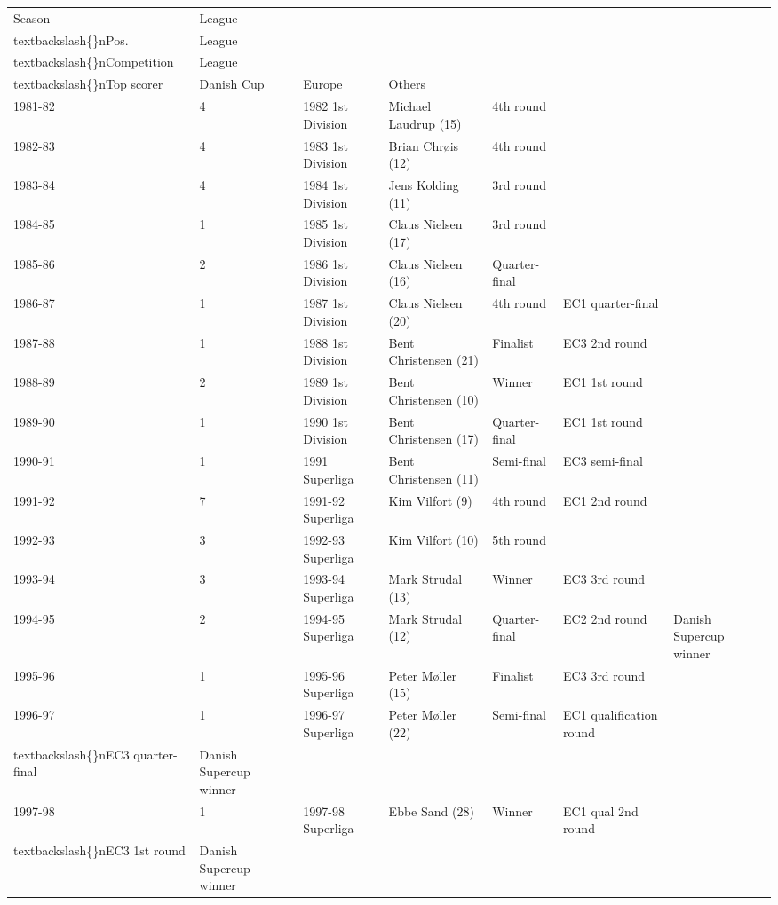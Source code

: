 \documentclass{article}
\begin{document}
\begin{tabular}{lllllll}
\toprule
Season & League\\textbackslash\{\}nPos. & League\\textbackslash\{\}nCompetition & League\\textbackslash\{\}nTop scorer & Danish Cup & Europe & Others \\
\midrule
1981-82 & 4 & 1982 1st Division & Michael Laudrup (15) & 4th round &  &  \\
1982-83 & 4 & 1983 1st Division & Brian Chrøis (12) & 4th round &  &  \\
1983-84 & 4 & 1984 1st Division & Jens Kolding (11) & 3rd round &  &  \\
1984-85 & 1 & 1985 1st Division & Claus Nielsen (17) & 3rd round &  &  \\
1985-86 & 2 & 1986 1st Division & Claus Nielsen (16) & Quarter-final &  &  \\
1986-87 & 1 & 1987 1st Division & Claus Nielsen (20) & 4th round & EC1 quarter-final &  \\
1987-88 & 1 & 1988 1st Division & Bent Christensen (21) & Finalist & EC3 2nd round &  \\
1988-89 & 2 & 1989 1st Division & Bent Christensen (10) & Winner & EC1 1st round &  \\
1989-90 & 1 & 1990 1st Division & Bent Christensen (17) & Quarter-final & EC1 1st round &  \\
1990-91 & 1 & 1991 Superliga & Bent Christensen (11) & Semi-final & EC3 semi-final &  \\
1991-92 & 7 & 1991-92 Superliga & Kim Vilfort (9) & 4th round & EC1 2nd round &  \\
1992-93 & 3 & 1992-93 Superliga & Kim Vilfort (10) & 5th round &  &  \\
1993-94 & 3 & 1993-94 Superliga & Mark Strudal (13) & Winner & EC3 3rd round &  \\
1994-95 & 2 & 1994-95 Superliga & Mark Strudal (12) & Quarter-final & EC2 2nd round & Danish Supercup winner \\
1995-96 & 1 & 1995-96 Superliga & Peter Møller (15) & Finalist & EC3 3rd round &  \\
1996-97 & 1 & 1996-97 Superliga & Peter Møller (22) & Semi-final & EC1 qualification round\\textbackslash\{\}nEC3 quarter-final & Danish Supercup winner \\
1997-98 & 1 & 1997-98 Superliga & Ebbe Sand (28) & Winner & EC1 qual 2nd round\\textbackslash\{\}nEC3 1st round & Danish Supercup winner \\

\end{tabular}
\end{document}
